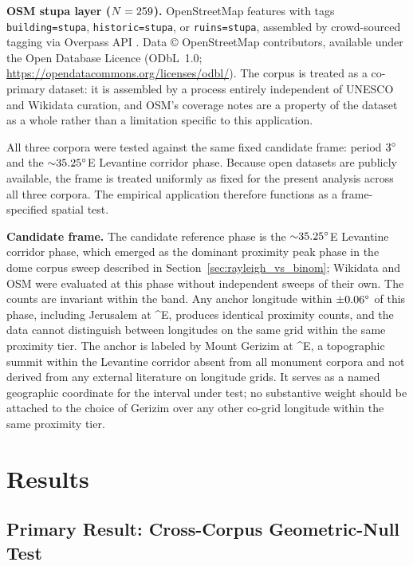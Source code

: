 \documentclass[12pt,a4paper]{article}
\newcommand{\degr}{\ifmmode^\circ\else\textdegree{}\fi}
\begin{document}
\textbf{OSM stupa layer ($N = 259{}$).}
OpenStreetMap features with tags \texttt{building=stupa},
\texttt{historic=stupa}, or \texttt{ruins=stupa}, assembled by
crowd-sourced tagging via Overpass API \citep{osmcontributors2024}.
Data \copyright{} OpenStreetMap contributors, available under the Open
Database Licence (ODbL~1.0; \url{https://opendatacommons.org/licenses/odbl/}).
The corpus is treated as a
co-primary dataset: it is assembled by a process entirely independent
of UNESCO and Wikidata curation, and OSM's coverage notes are a
property of the dataset as a whole rather than a limitation specific
to this application.

All three corpora were tested against the same fixed candidate
frame: period $3\degr$ and the ${\sim}35.25\degr$E Levantine corridor
phase. Because open datasets are publicly available, the frame is
treated uniformly as fixed for the present analysis across all three
corpora. The empirical application therefore functions as a
frame-specified spatial test.

\textbf{Candidate frame.}
The candidate reference phase is the ${\sim}35.25\degr$E Levantine corridor
phase, which emerged as the dominant proximity peak phase in the dome corpus
sweep described in Section~\ref{sec:rayleigh_vs_binom}; Wikidata and OSM were
evaluated at this phase without independent sweeps of their own.
The counts are invariant within the band. Any anchor longitude within
${\pm}\AppThreshDeg\degr$ of this phase, including Jerusalem at
\JerusalemLon\degr{}E, produces identical proximity counts, and the data
cannot distinguish between longitudes on the same grid within the same proximity tier.
The anchor is labeled by Mount Gerizim at \GerizimLon\degr{}E, a topographic
summit within the Levantine corridor absent from all monument corpora and not
derived from any external literature on longitude grids. It serves as a named
geographic coordinate for the interval under test; no substantive weight should
be attached to the choice of Gerizim over any other co-grid longitude within the
same proximity tier.

\section{Results}
\label{sec:results}

\subsection{Primary Result: Cross-Corpus Geometric-Null Test}
\end{document}
